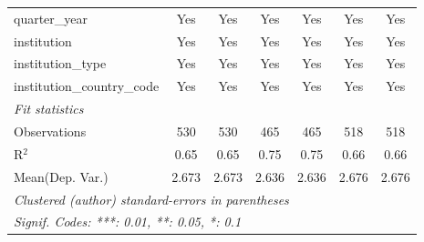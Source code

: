 \begin{tabular}{lcccccc}
   quarter\_year                      & Yes     & Yes       & Yes     & Yes     & Yes     & Yes\\  
   institution                        & Yes     & Yes       & Yes     & Yes     & Yes     & Yes\\  
   institution\_type                  & Yes     & Yes       & Yes     & Yes     & Yes     & Yes\\  
   institution\_country\_code         & Yes     & Yes       & Yes     & Yes     & Yes     & Yes\\  
   \midrule
   \emph{Fit statistics}\\
   Observations                       & 530     & 530       & 465     & 465     & 518     & 518\\  
   R$^2$                              & 0.65    & 0.65      & 0.75    & 0.75    & 0.66    & 0.66\\  
Mean(Dep. Var.) & 2.673 & 2.673 & 2.636 & 2.636 & 2.676 & 2.676 \\
   \midrule \midrule
   \multicolumn{7}{l}{\emph{Clustered (author) standard-errors in parentheses}}\\
   \multicolumn{7}{l}{\emph{Signif. Codes: ***: 0.01, **: 0.05, *: 0.1}}\\
\end{tabular}
\par\endgroup

